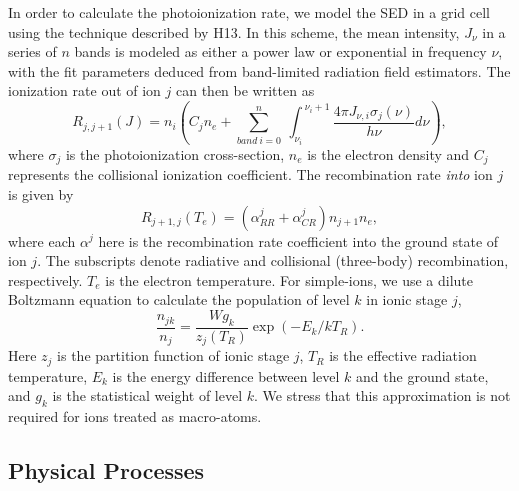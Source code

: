 \documentclass[useAMS,usenatbib]{mn2e_x}
\begin{document}
In order to calculate the photoionization rate, 
we model the SED in a grid cell using the technique described by H13. In this scheme,
the mean intensity, $J_{\nu}$ in a series of $n$ bands is modeled as either a power law or exponential
in frequency $\nu$, with the fit parameters deduced from band-limited radiation field estimators.
The ionization rate out of ion $j$ can then be written as 
\begin{equation}
R_{j,j+1}(J)= 
\displaystyle{
n_i \left(C_{j} n_e + 
\sum_{band~i=0}^{n}~
{\int_{\nu_i}^{~\nu_i+1} \frac{4 \pi J_{\nu,i}\sigma_j(\nu)}  {h \nu} d\nu}
\right),}
\end{equation}
where $\sigma_j$ is the photoionization cross-section, $n_e$
is the electron density and $C_{j}$
represents the collisional ionization coefficient.
The recombination rate {\em into} ion $j$ is given by 
\begin{equation}
R_{j+1,j}(T_e) = (\alpha^j_{RR} + \alpha^j_{CR}) n_{j+1} n_e,
\end{equation}
where each $\alpha^j$ here is the recombination rate coefficient into the ground state of ion $j$.
The subscripts denote radiative and 
collisional (three-body) recombination, respectively. 
$T_e$ is the electron temperature.
For simple-ions, we use a dilute Boltzmann equation to calculate 
the population of level $k$ in ionic stage $j$,
\begin{equation}
\frac{n_{jk}}{n_j} = \frac{W g_k}{z_j(T_R)} \exp(-E_k/kT_R).
\end{equation}
Here $z_j$ is the partition function of ionic stage $j$,
$T_R$ is the effective radiation temperature,
$E_k$ is the energy difference between level $k$ and the ground state,
and $g_k$ is the statistical weight of level $k$. 
We stress that this approximation is not required for ions
treated as macro-atoms.

\subsection{Physical Processes}
\end{document}
